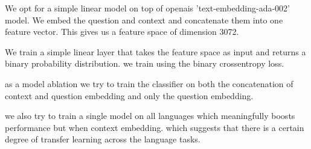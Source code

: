\documentclass[11pt]{article}
\begin{document}
We opt for a simple linear model on top of openais 'text-embedding-ada-002' model. 
We embed the question and context and concatenate them into one feature vector. 
This gives us a feature space of dimension 3072.

We train a simple linear layer that takes the feature space as input and returns a binary probability distribution. we train using the binary crossentropy loss.

as a model ablation we try to train the classifier on both the concatenation of context and question embedding and only the question embedding.


\begin{table}[ht]
    \centering
    \caption{Model performance for language-specific and combined training, with and without context}
    \label{tab:model_performance}
\end{table}

we also try to train a single model on all languages which meaningfully boosts performance 
but when context embedding. which suggests that there is a certain degree of transfer learning across the language tasks.
\end{document}
